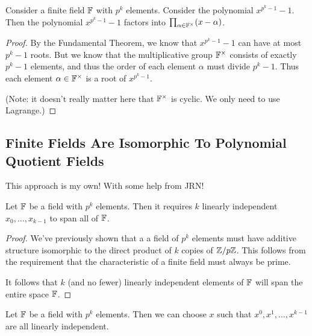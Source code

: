 \begin{proposition}
  Consider a finite field $\mathbb{F}$ with $p^k$ elements. Consider the
  polynomial $x^{p^k - 1} - 1$. Then the polynomial $x^{p^k - 1} - 1$
  factors into $\prod_{\alpha \in \mathbb{F}^\times} \mathopen{}\left( {x - \alpha} \right)\mathclose{}$.
\end{proposition}

\begin{proof}
  By the Fundamental Theorem, we know that $x^{p^k - 1} - 1$ can have at
  most $p^k - 1$ roots. But we know that the multiplicative group
  $\mathbb{F}^\times$ consists of exactly $p^k - 1$ elements, and thus the order
  of each element $\alpha$ must divide $p^k - 1$. Thus each element
  $\alpha \in \mathbb{F}^\times$ is a root of $x^{p^k - 1}$.

  (Note: it doesn't really matter here that $\mathbb{F}^\times$ is cyclic. We
  only need to use Lagrange.)
\end{proof}

\subsection{Finite Fields Are Isomorphic To Polynomial Quotient Fields}

\begin{remark}
  This approach is my own! With some help from JRN!
\end{remark}

\begin{lemma}
  Let $\mathbb{F}$ be a field with $p^k$ elements. Then it requires $k$ linearly
  independent $x_0, \ldots, x_{k-1}$ to span all of $\mathbb{F}$.
\end{lemma}

\begin{proof}
  We've previously shown that a a field of $p^k$ elements must have
  additive structure isomorphic to the direct product of $k$ copies of
  $\mathbb{Z} / p\mathbb{Z}$. This follows from the requirement that the characteristic of
  a finite field must always be prime.

  It follows that $k$ (and no fewer) linearly independent elements of
  $\mathbb{F}$ will span the entire space $\mathbb{F}$.
\end{proof}

\begin{lemma}
  Let $\mathbb{F}$ be a field with $p^k$ elements. Then we can choose $x$ such
  that $x^0, x^1, \ldots, x^{k-1}$ are all linearly independent.
\end{lemma}

